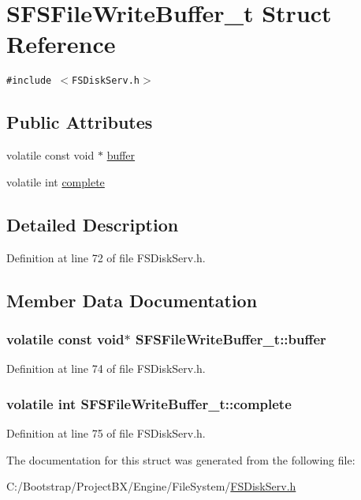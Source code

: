 \hypertarget{struct_s_f_s_file_write_buffer__t}{
\section{SFSFileWriteBuffer\_\-t Struct Reference}
\label{struct_s_f_s_file_write_buffer__t}
}
{\tt \#include $<$FSDiskServ.h$>$}

\subsection*{Public Attributes}
\begin{CompactItemize}
\item 
volatile const void $\ast$ \hyperlink{struct_s_f_s_file_write_buffer__t_e7d9298412a9564b5eeec70f8095ed37}{buffer}
\item 
volatile int \hyperlink{struct_s_f_s_file_write_buffer__t_d0b3938d8a46849111f6b6b244c2e026}{complete}
\end{CompactItemize}


\subsection{Detailed Description}


Definition at line 72 of file FSDiskServ.h.

\subsection{Member Data Documentation}
\hypertarget{struct_s_f_s_file_write_buffer__t_e7d9298412a9564b5eeec70f8095ed37}{
\subsubsection[{buffer}]{\setlength{\rightskip}{0pt plus 5cm}volatile const void$\ast$ {\bf SFSFileWriteBuffer\_\-t::buffer}}}
\label{struct_s_f_s_file_write_buffer__t_e7d9298412a9564b5eeec70f8095ed37}




Definition at line 74 of file FSDiskServ.h.\hypertarget{struct_s_f_s_file_write_buffer__t_d0b3938d8a46849111f6b6b244c2e026}{
\subsubsection[{complete}]{\setlength{\rightskip}{0pt plus 5cm}volatile int {\bf SFSFileWriteBuffer\_\-t::complete}}}
\label{struct_s_f_s_file_write_buffer__t_d0b3938d8a46849111f6b6b244c2e026}




Definition at line 75 of file FSDiskServ.h.

The documentation for this struct was generated from the following file:\begin{CompactItemize}
\item 
C:/Bootstrap/ProjectBX/Engine/FileSystem/\hyperlink{_f_s_disk_serv_8h}{FSDiskServ.h}\end{CompactItemize}
